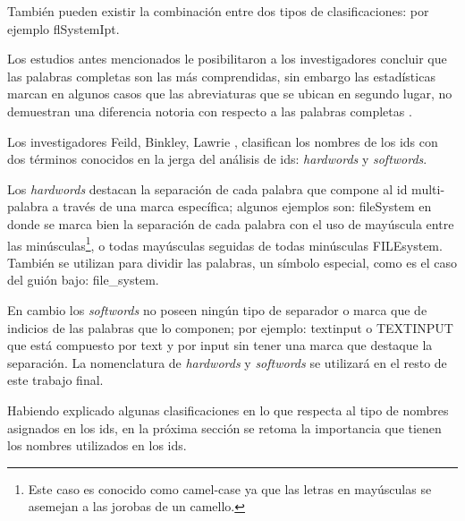 También pueden existir la combinación entre dos tipos de clasificaciones: por ejemplo \textsf{flSystemIpt}.

Los estudios antes mencionados le posibilitaron a los investigadores concluir que las palabras completas son las más comprendidas, sin embargo las estadísticas marcan en algunos casos que las abreviaturas que se ubican en segundo lugar, no demuestran una diferencia notoria con respecto a las palabras completas \cite{DCHD06,SBMJ10}.

Los investigadores Feild, Binkley, Lawrie \cite{FBL06,HDD06,BMDDL09,DMDJ13}, clasifican los nombres de los ids con dos términos conocidos en la jerga del análisis de ids: \textit{hardwords} y \textit{softwords}.

Los \textit{hardwords} destacan la separación de cada palabra que compone al id multi-palabra a través de una marca específica; algunos ejemplos son: \mbox{\textsf{fileSystem}} en donde se marca bien la separación de cada palabra con el uso de mayúscula entre las minúsculas\footnote[1]{Este caso es conocido como camel-case ya que las letras en mayúsculas se asemejan a las jorobas de un camello.}, o todas mayúsculas seguidas de todas minúsculas \mbox{\textsf{FILEsystem}}. También se utilizan para dividir las palabras, un símbolo especial, como es el caso del guión bajo: \textsf{file\_system}. 

En cambio los \textit{softwords} no poseen ningún tipo de separador o marca que de indicios de las palabras que lo componen; por ejemplo: \textsf{textinput} o \mbox{\textsf{TEXTINPUT}} que está compuesto por \textsf{text} y por \textsf{input} sin tener una marca que destaque la separación.
La nomenclatura de \textit{hardwords} y \textit{softwords} se utilizará en el resto de este trabajo final. 

Habiendo explicado algunas clasificaciones en lo que respecta al tipo de nombres asignados en los ids, en la próxima sección se retoma la importancia que tienen los nombres utilizados en los ids.


